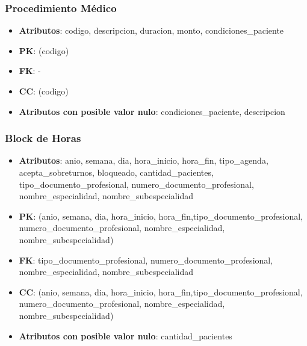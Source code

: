 \documentclass[a4paper,11pt]{article}
\begin{document}
\subsubsection{\textbf{Procedimiento Médico}}

\begin{itemize}

\item 
\textbf{Atributos}: codigo, descripcion, duracion, monto, condiciones\_paciente

\item 
\textbf{PK}: (codigo)

\item
\textbf{FK}: - 

\item 
\textbf{CC}: (codigo)

\item 
\textbf{Atributos con posible valor nulo}: condiciones\_paciente, descripcion

\end{itemize}


\subsubsection{\textbf{Block de Horas}}

\begin{itemize}

\item 
\textbf{Atributos}:  anio, semana, dia, hora\_inicio, hora\_fin, tipo\_agenda, acepta\_sobreturnos,  bloqueado, cantidad\_pacientes, tipo\_documento\_profesional, numero\_documento\_profesional, nombre\_especialidad, nombre\_subespecialidad

\item 
\textbf{PK}: (anio, semana, dia, hora\_inicio, hora\_fin,tipo\_documento\_profesional, numero\_documento\_profesional, nombre\_especialidad, nombre\_subespecialidad)

\item
\textbf{FK}:  tipo\_documento\_profesional, numero\_documento\_profesional, nombre\_especialidad, nombre\_subespecialidad

\item 
\textbf{CC}: (anio, semana, dia, hora\_inicio, hora\_fin,tipo\_documento\_profesional, numero\_documento\_profesional, nombre\_especialidad, nombre\_subespecialidad)

\item 
\textbf{Atributos con posible valor nulo}: cantidad\_pacientes

\end{itemize}
\end{document}
